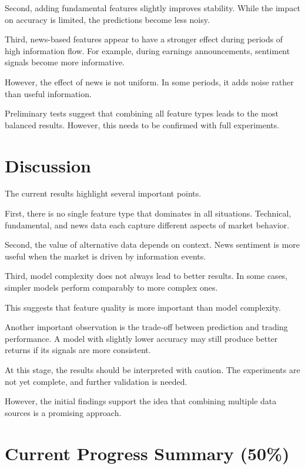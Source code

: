 \documentclass[12pt,a4paper]{article}
\begin{document}
Second, adding fundamental features slightly improves stability. While the impact on accuracy is limited, the predictions become less noisy.

Third, news-based features appear to have a stronger effect during periods of high information flow. For example, during earnings announcements, sentiment signals become more informative.

However, the effect of news is not uniform. In some periods, it adds noise rather than useful information.

Preliminary tests suggest that combining all feature types leads to the most balanced results. However, this needs to be confirmed with full experiments.

\section{Discussion}

The current results highlight several important points.

First, there is no single feature type that dominates in all situations. Technical, fundamental, and news data each capture different aspects of market behavior.

Second, the value of alternative data depends on context. News sentiment is more useful when the market is driven by information events.

Third, model complexity does not always lead to better results. In some cases, simpler models perform comparably to more complex ones.

This suggests that feature quality is more important than model complexity.

Another important observation is the trade-off between prediction and trading performance. A model with slightly lower accuracy may still produce better returns if its signals are more consistent.

At this stage, the results should be interpreted with caution. The experiments are not yet complete, and further validation is needed.

However, the initial findings support the idea that combining multiple data sources is a promising approach.

\section{Current Progress Summary (50\%)}
\end{document}
